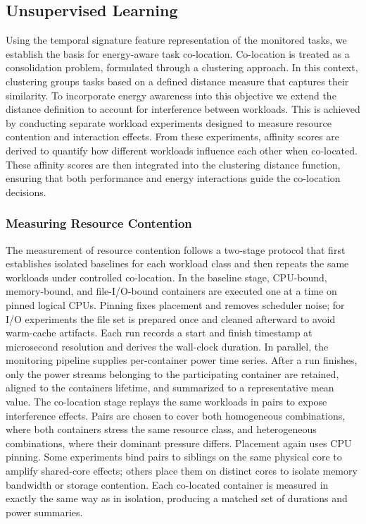\subsection{Unsupervised Learning}
\label{sec:unsupervised_learning}
Using the temporal signature feature representation of the monitored tasks, we establish the basis for energy-aware task co-location. Co-location is treated as a consolidation problem, formulated through a clustering approach. In this context, clustering groups tasks based on a defined distance measure that captures their similarity. To incorporate energy awareness into this objective we extend the distance definition to account for interference between workloads. This is achieved by conducting separate workload experiments designed to measure resource contention and interaction effects. From these experiments, affinity scores are derived to quantify how different workloads influence each other when co-located. These affinity scores are then integrated into the clustering distance function, ensuring that both performance and energy interactions guide the co-location decisions.

\subsubsection{Measuring Resource Contention}
\label{sec:measuring_resource_contention}

The measurement of resource contention follows a two-stage protocol that first establishes isolated baselines for each workload class and then repeats the same workloads under controlled co-location. In the baseline stage, CPU-bound, memory-bound, and file-I/O-bound containers are executed one at a time on pinned logical CPUs. Pinning fixes placement and removes scheduler noise; for I/O experiments the file set is prepared once and cleaned afterward to avoid warm-cache artifacts. Each run records a start and finish timestamp at microsecond resolution and derives the wall-clock duration. In parallel, the monitoring pipeline supplies per-container power time series. After a run finishes, only the power streams belonging to the participating container are retained, aligned to the containers lifetime, and summarized to a representative mean value.
The co-location stage replays the same workloads in pairs to expose interference effects. Pairs are chosen to cover both homogeneous combinations, where both containers stress the same resource class, and heterogeneous combinations, where their dominant pressure differs. Placement again uses CPU pinning. Some experiments bind pairs to siblings on the same physical core to amplify shared-core effects; others place them on distinct cores to isolate memory bandwidth or storage contention. Each co-located container is measured in exactly the same way as in isolation, producing a matched set of durations and power summaries.


